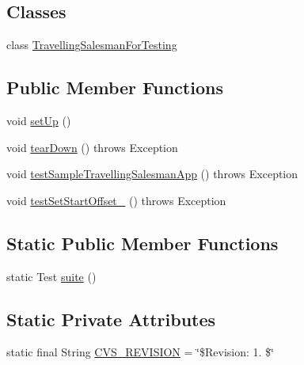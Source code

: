 \subsection*{Classes}
\begin{DoxyCompactItemize}
\item 
class \hyperlink{classorg_1_1jgap_1_1impl_1_1salesman_1_1_travelling_salesman_test_1_1_travelling_salesman_for_testing}{Travelling\-Salesman\-For\-Testing}
\end{DoxyCompactItemize}
\subsection*{Public Member Functions}
\begin{DoxyCompactItemize}
\item 
void \hyperlink{classorg_1_1jgap_1_1impl_1_1salesman_1_1_travelling_salesman_test_a22ed535969ae9c188edbad62b18c23bd}{set\-Up} ()
\item 
void \hyperlink{classorg_1_1jgap_1_1impl_1_1salesman_1_1_travelling_salesman_test_a67b743fd6cff4436da5718fe88ba57ef}{tear\-Down} ()  throws Exception 
\item 
void \hyperlink{classorg_1_1jgap_1_1impl_1_1salesman_1_1_travelling_salesman_test_aaae7ee58696353477a2337fdfb3246f7}{test\-Sample\-Travelling\-Salesman\-App} ()  throws Exception 
\item 
void \hyperlink{classorg_1_1jgap_1_1impl_1_1salesman_1_1_travelling_salesman_test_aa7f222f2abe404cf53186363efc3bb14}{test\-Set\-Start\-Offset\-\_} ()  throws Exception 
\end{DoxyCompactItemize}
\subsection*{Static Public Member Functions}
\begin{DoxyCompactItemize}
\item 
static Test \hyperlink{classorg_1_1jgap_1_1impl_1_1salesman_1_1_travelling_salesman_test_aeccdc490649f798468f3a8a21b6b438d}{suite} ()
\end{DoxyCompactItemize}
\subsection*{Static Private Attributes}
\begin{DoxyCompactItemize}
\item 
static final String \hyperlink{classorg_1_1jgap_1_1impl_1_1salesman_1_1_travelling_salesman_test_a1494566bfd9ee87beb671b28751814c9}{C\-V\-S\-\_\-\-R\-E\-V\-I\-S\-I\-O\-N} = \char`\"{}\$Revision\-: 1. \$\char`\"{}
\end{DoxyCompactItemize}
